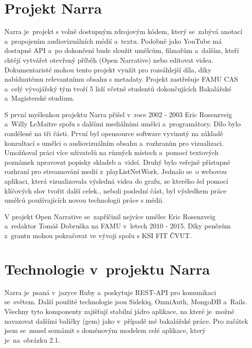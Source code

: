 \section{Projekt Narra}
\par Narra\cite{narra} je~projekt s volně dostupným zdrojovým kódem, který se~zabývá anotací a~propojením audiovizuálních médií a~textu. Podobně jako YouTube má dostupné API a~po dokončení bude sloužit umělcům, filmařům a~dalším, kteří chtějí vytvářet otevřený příběh (Open Narrative) nebo editovat videa. Dokumentaristé mohou tento projekt využít pro rozsáhlejší díla, díky nabídnutému relevantnímu obsahu s metadaty. Projekt zastřešuje FAMU CAS a~celý vývojářský tým tvoří 5 lidí včetně studentů dokončujících Bakalářské a~Magisterské studium.
\par S první myšlenkou projektu Narra přišel v~roce 2002 - 2003 Eric Rosenzveig a~Willy LeMaitre spolu s dalšími mediálními umělci a~programátory. Dílo bylo rozdělené na tři části. První byl opensource software vyvinutý na základě konzultací s umělci o audiovizuálním obsahu a~rozhraním pro vizualizaci. Umožňoval práci více uživatelů na různých místech a~pomocí textových poznámek upravovat popisky skladeb a~videí. Druhý bylo veřejně přístupné rozhraní pro streamování medií z~playListNetWork. Jednalo se~o webovou aplikaci, která vizualizovala výsledná videa do grafu, ze kterého šel pomocí klíčových slov tvořit další celek., neboli poslední část, byl výsledkem práce umělců používajících novou technologii práce s médii.
\par V projekt Open Narrative se~zapříčinil nejvíce umělec Eric Rosenzveig a~redaktor Tomáš Dobruška na FAMU v~letech 2010 - 2015. Díky penězům z~grantu mohou pokračovat ve vývoji spolu s KSI FIT ČVUT.

\section{Technologie v~projektu Narra} 
\par Narra je~psaná v~jazyce Ruby a~poskytuje REST-API pro komunikaci se~světem. Další použité technologie jsou Sidekiq, OmniAuth, MongoDB a~Rails. Všechny tyto komponenty zajišťují stabilní jádro aplikace, na které je~možné navazovat dalšími balíčky (gem) jako v~případě mé bakalářské práce. Pro začátek jsem se~musel seznámit s doménovým modelem\cite{michalmoc} celé aplikace, který je~na~obrázku 2.1.


